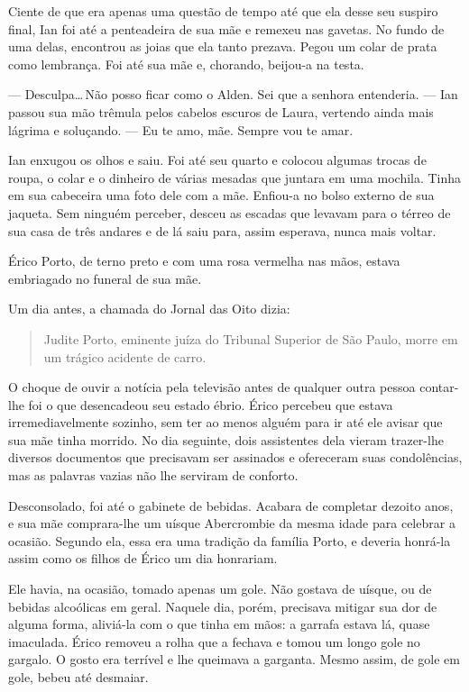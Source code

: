 Ciente de que era apenas uma questão de tempo até que ela desse seu
suspiro final, Ian foi até a penteadeira de sua mãe e remexeu nas
gavetas. No fundo de uma delas, encontrou as joias que ela tanto
prezava. Pegou um colar de prata como lembrança. Foi até sua mãe e,
chorando, beijou-a na testa.

--- Desculpa\ldots\,Não posso ficar como o Alden. Sei que a senhora
entenderia. --- Ian passou sua mão trêmula pelos cabelos escuros de Laura,
vertendo ainda mais lágrima e soluçando. --- Eu te amo, mãe. Sempre vou te
amar.

Ian enxugou os olhos e saiu. Foi até seu quarto e colocou algumas trocas
de roupa, o colar e o dinheiro de várias mesadas que juntara em uma
mochila. Tinha em sua cabeceira uma foto dele com a mãe. Enfiou-a no
bolso externo de sua jaqueta. Sem ninguém perceber, desceu as escadas
que levavam para o térreo de sua casa de três andares e de lá saiu para,
assim esperava, nunca mais voltar.

\espaco
{}

Érico Porto, de terno preto e com uma rosa vermelha nas mãos, estava
embriagado no funeral de sua mãe.

Um dia antes, a chamada do Jornal das Oito dizia:

  \begin{quote}
  Judite Porto, eminente juíza do Tribunal Superior de São Paulo, morre
  em um trágico acidente de carro.
  \end{quote}

O choque de ouvir a notícia pela televisão antes de qualquer outra
pessoa contar-lhe foi o que desencadeou seu estado ébrio. Érico percebeu
que estava irremediavelmente sozinho, sem ter ao menos alguém para ir
até ele avisar que sua mãe tinha morrido. No dia seguinte, dois
assistentes dela vieram trazer-lhe diversos documentos que precisavam
ser assinados e ofereceram suas condolências, mas as palavras vazias não
lhe serviram de conforto.

Desconsolado, foi até o gabinete de bebidas. Acabara de completar
dezoito anos, e sua mãe comprara-lhe um uísque Abercrombie da mesma
idade para celebrar a ocasião. Segundo ela, essa era uma tradição da
família Porto, e deveria honrá-la assim como os filhos de Érico um dia
honrariam.

Ele havia, na ocasião, tomado apenas um gole. Não gostava de uísque, ou
de bebidas alcoólicas em geral. Naquele dia, porém, precisava mitigar
sua dor de alguma forma, aliviá-la com o que tinha em mãos: a garrafa
estava lá, quase imaculada. Érico removeu a rolha que a fechava e tomou
um longo gole no gargalo. O gosto era terrível e lhe queimava a
garganta. Mesmo assim, de gole em gole, bebeu até desmaiar.

